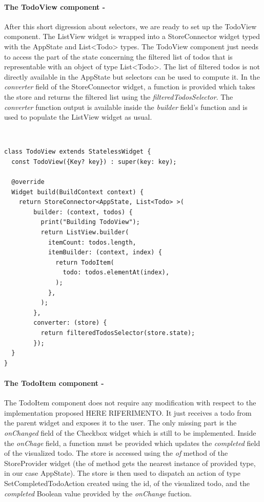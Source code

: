 \paragraph{The TodoView component - }
\label{subpar:todo_app_bloc_core_state}
After this short digression about selectors, we are ready to set up the TodoView component. The ListView widget is wrapped into a StoreConnector widget typed with the AppState and List<Todo> types. The TodoView component just needs to access the part of the state concerning the filtered list of todos that is representable with an object of type List<Todo>. The list of filtered todos is not directly available in the AppState but selectors can be used to compute it. In the \textit{converter }field of the StoreConnector widget, a function is provided which takes the store and returns the filtered list using the \textit{filteredTodosSelector}. The \textit{converter} function output is available inside the \textit{builder} field's function and is used to populate the ListView widget as usual. 
\begin{code}
\mbox{}\\
 \mbox{}
		\label{code:2.14}
\begin{verbatim}
class TodoView extends StatelessWidget {
  const TodoView({Key? key}) : super(key: key);

  @override
  Widget build(BuildContext context) {
    return StoreConnector<AppState, List<Todo> >(
        builder: (context, todos) {
          print("Building TodoView");
          return ListView.builder(
            itemCount: todos.length,
            itemBuilder: (context, index) {
              return TodoItem(
                todo: todos.elementAt(index),
              );
            },
          );
        },
        converter: (store) {
          return filteredTodosSelector(store.state);
        });
  }
}
\end{verbatim}
\mbox{}
\end{code}

\paragraph{The TodoItem component - }
\label{subpar:todo_app_bloc_core_state}

The TodoItem component does not require any modification with respect to the implementation proposed HERE RIFERIMENTO. It just receives a todo from the parent widget and exposes it to the user. The only missing part is the \textit{onChanged} field of the Checkbox widget which is still to be implemented. Inside the \textit{onChage} field, a function must be provided which updates the \textit{completed} field of the visualized todo. The store is accessed using the \textit{of} method of the StoreProvider widget (the of method gets the nearest instance of provided type, in our case AppState). The store is then used to dispatch an action of type SetCompletedTodoAction created using the id, of the visualized todo, and the \textit{completed} Boolean value provided by the \textit{onChange} fuction.

